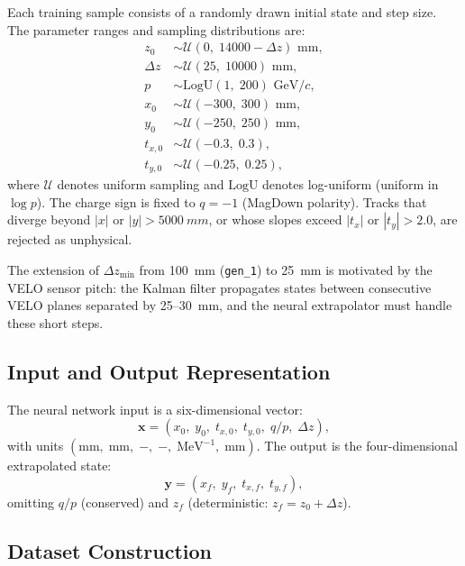 \documentclass[a4paper,11pt]{article}
\newcommand{\SI}[2]{#1~#2}
\newcommand{\SIrange}[3]{#1--#2~#3}
\newcommand{\mm}{mm}
\newcommand{\dz}{\Delta z}
\begin{document}
Each training sample consists of a randomly drawn initial state and step
size.  The parameter ranges and sampling distributions are:
\begin{align}
  z_0        &\sim \mathcal{U}(0,\; 14000 - \dz) \text{ mm}, \label{eq:z0} \\
  \dz        &\sim \mathcal{U}(25,\; 10000) \text{ mm}, \label{eq:dz} \\
  p          &\sim \text{LogU}(1,\; 200) \text{ GeV}/c, \label{eq:p} \\
  x_0        &\sim \mathcal{U}(-300,\; 300) \text{ mm}, \label{eq:x0} \\
  y_0        &\sim \mathcal{U}(-250,\; 250) \text{ mm}, \label{eq:y0} \\
  t_{x,0}    &\sim \mathcal{U}(-0.3,\; 0.3), \label{eq:tx0} \\
  t_{y,0}    &\sim \mathcal{U}(-0.25,\; 0.25), \label{eq:ty0}
\end{align}
where $\mathcal{U}$ denotes uniform sampling and $\text{LogU}$ denotes
log-uniform (uniform in $\log p$).  The charge sign is fixed to $q = -1$
(MagDown polarity).  Tracks that diverge beyond $|x|$ or $|y| >
\SI{5000}{\mm}$, or whose slopes exceed $|t_x|$ or $|t_y| > 2.0$, are
rejected as unphysical.

The extension of $\dz_\text{min}$ from \SI{100}{\mm} (\texttt{gen\_1}) to
\SI{25}{\mm} is motivated by the VELO sensor pitch: the Kalman filter
propagates states between consecutive VELO planes separated by
\SIrange{25}{30}{\mm}, and the neural extrapolator must handle these
short steps.

\subsection{Input and Output Representation}
\label{sec:io_format}

The neural network input is a six-dimensional vector:
\begin{equation}
  \mathbf{x} = (x_0,\; y_0,\; t_{x,0},\; t_{y,0},\; q/p,\; \dz),
  \label{eq:input}
\end{equation}
with units $(\text{mm},\; \text{mm},\; -,\; -,\; \text{MeV}^{-1},\;
\text{mm})$.  The output is the four-dimensional extrapolated state:
\begin{equation}
  \mathbf{y} = (x_f,\; y_f,\; t_{x,f},\; t_{y,f}),
  \label{eq:output}
\end{equation}
omitting $q/p$ (conserved) and $z_f$ (deterministic: $z_f = z_0 + \dz$).

\subsection{Dataset Construction}
\end{document}

